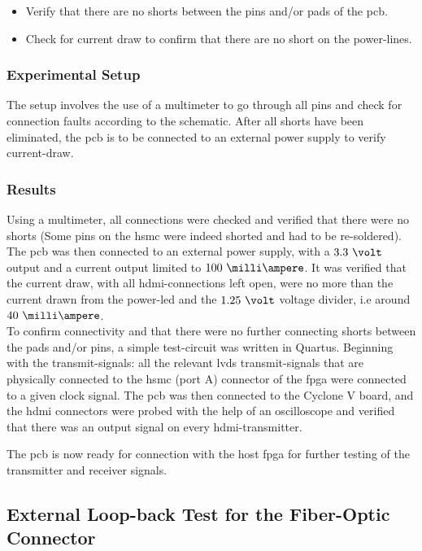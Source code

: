 \documentclass[main.tex]{subfiles}
\begin{document}
\begin{itemize}\setlength{\itemsep}{10pt}
\item Verify that there are no shorts between the pins and/or pads of the \gls{pcb}. 
\item Check for current draw to confirm that there are no short on the power-lines.
\end{itemize}

\subsubsection{Experimental Setup}

The setup involves the use of a multimeter to go through all pins and check for connection faults according to the schematic. After all shorts have been eliminated, the \gls{pcb} is to be connected to an external power supply to verify current-draw. 

\subsubsection{Results}
 Using a multimeter, all connections were checked and verified that there were no shorts (Some pins on the \gls{hsmc} were indeed shorted and had to be re-soldered). The \gls{pcb} was then connected to an external power supply, with a $3.3~\volt$ output and a current output limited to $100~\milli\ampere$. It was verified that the current draw, with all \gls{hdmi}-connections left open, were no more than the current drawn from the power-\acrshort{led} and the $1.25~\volt$ voltage divider, i.e around $40~\milli\ampere$. \\

To confirm connectivity and that there were no further connecting shorts between the pads and/or pins, a simple test-circuit was written in Quartus. Beginning with the transmit-signals: all the relevant \gls{lvds} transmit-signals that are physically connected to the \gls{hsmc} (port A) connector of the \gls{fpga} were connected to a given clock signal. The \gls{pcb} was then connected to the Cyclone V board, and the \gls{hdmi} connectors were probed with the help of an oscilloscope and verified that there was an output signal on every \gls{hdmi}-transmitter. 

The \gls{pcb} is now ready for connection with the host \gls{fpga} for further testing of the transmitter and receiver signals. 

\subsection{External Loop-back Test for the Fiber-Optic Connector} \label{sec:exlooptest}
\end{document}
